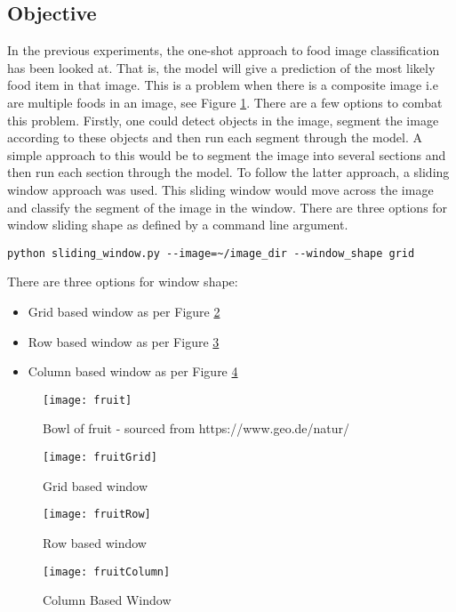 \subsection*{Objective}
In the previous experiments, the one-shot approach to food image
classification has been looked at. That is, the model will give a prediction of the most likely
food item in that image. This is a problem when there is a composite image i.e are multiple foods in an
image, see Figure \ref{fig:fruit}. There are a few options to combat this problem. Firstly, one could detect
objects in the image, segment the image according to these objects and then run
each segment through the model.
A simple approach to this would be to segment
the image into several sections and then run each section through the model.
To follow the latter approach, a sliding window approach was used. This
sliding window would move across the image and classify the segment of the image
in the window. There are three options for window sliding shape as defined by a
command line argument.

\begin{lstlisting}[style=Command]
python sliding_window.py --image=~/image_dir --window_shape grid
\end{lstlisting}

There are three options for window shape:
\begin{itemize}
	\item{Grid based window as per Figure \ref{fig:fruitGrid}}
	\item{Row based window as per Figure \ref{fig:fruitRow}}
	\item{Column based window as per Figure \ref{fig:fruitColumn}}
\end{itemize}

\begin{figure}
    \texttt{[image: fruit]}
    \caption{Bowl of fruit - sourced from https://www.geo.de/natur/}
    \label{fig:fruit}
\end{figure}

\begin{figure}
    \texttt{[image: fruitGrid]}
	\caption{Grid based window}
    \label{fig:fruitGrid}
\end{figure}

\begin{figure}
    \texttt{[image: fruitRow]}
    \caption{Row based window}
    \label{fig:fruitRow}
\end{figure}

\begin{figure}
    \texttt{[image: fruitColumn]}
    \caption{Column Based Window}
    \label{fig:fruitColumn}
\end{figure}

